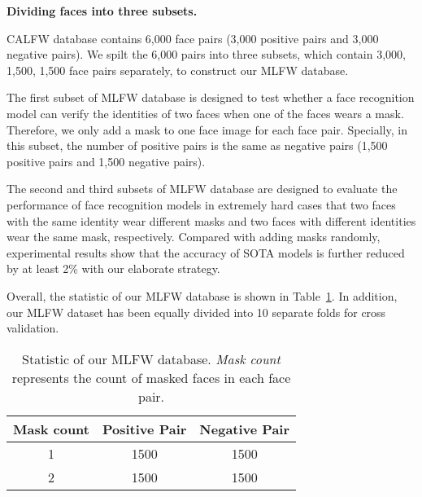 \documentclass[final]{cvpr}
\begin{document}
\textbf{Dividing faces into three subsets.}

CALFW database contains 6,000 face pairs (3,000 positive pairs and 3,000 negative pairs).
We spilt the 6,000 pairs into three subsets, which contain 3,000, 1,500, 1,500 face pairs separately, to construct our MLFW database.

The first subset of MLFW database is designed to test whether a face recognition model can verify the identities of two faces when one of the faces wears a mask.
Therefore, we only add a mask to one face image for each face pair.
Specially, in this subset, the number of positive pairs is the same as negative pairs (1,500 positive pairs and 1,500 negative pairs).

The second and third subsets of MLFW database are designed to evaluate the performance of face recognition models in extremely hard cases that two faces with the same identity wear different masks and two faces with different identities wear the same mask, respectively.
Compared with adding masks randomly, experimental results show that the accuracy of SOTA models is further reduced by at least 2\% with our elaborate strategy.

Overall, the statistic of our MLFW database is shown in Table~\ref{tab:table0}. 
In addition, our MLFW dataset has been equally divided into 10 separate folds for cross validation.

\begin{table}[bh]
	\begin{center}
		\begin{tabular}{c|cc}
			\toprule
			Mask count & Positive Pair & Negative Pair\\
			\midrule
			1 & 1500 & 1500 \\
			2 & 1500 & 1500 \\\bottomrule
		\end{tabular}
	\end{center}
	\caption{Statistic of our MLFW database. \textit{Mask count} represents the count of masked faces in each face pair. }
	\label{tab:table0}
\end{table}
\end{document}
